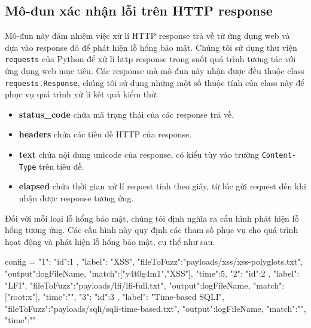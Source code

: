 \subsection{Mô-đun xác nhận lỗi trên HTTP response}
Mô-đun này đảm nhiệm việc xử lí HTTP response trả về từ ứng dụng web và dựa vào response đó để phát hiện lỗ hổng bảo mật. Chúng tôi sử dụng thư viện \texttt{requests} của Python để xử lí \acrshort{http} response trong suốt quá trình tương tác với ứng dụng web mục tiêu. Các response mà mô-đun này nhận được đều thuộc class \texttt{requests.Response}, chúng tôi sử dụng những một số thuộc tính của class này để phục vụ quá trình xử lí kêt quả kiểm thử.
\begin{itemize}
    \item \textbf{status\_code} chứa mã trạng thái của các response trả về.
    \item \textbf{headers} chứa các tiêu đề HTTP của response.
    \item \textbf{text} chứa nội dung unicode của response, có kiểu tùy vào trường \texttt{Content-Type} trên tiêu đề.
    \item \textbf{elapsed} chứa thời gian xử lí request tính theo giây, từ lúc gửi request đến khi nhận được response tương ứng.
\end{itemize}
Đối với mỗi loại lỗ hổng bảo mật, chúng tôi định nghĩa ra cấu hình phát hiện lỗ hổng tương ứng. Các cấu hình này quy định các tham số phục vụ cho quá trình họat động và phát hiện lỗ hổng bảo mật, cụ thể như sau.\\
\begin{python}
config = {
    "1": {"id":1 , "label": "XSS", "fileToFuzz":"payloads/xss/xss-polyglots.txt", "output":logFileName, "match":["y4t0g4m1","XSS"], "time":5},
    "2": {"id":2 , "label": "LFI", "fileToFuzz":"payloads/lfi/lfi-full.txt", "output":logFileName, "match":["root:x"], "time":""},
    "3": {"id":3 , "label": "Time-based SQLI", "fileToFuzz":"payloads/sqli/sqli-time-based.txt", "output":logFileName, "match":"", "time":""}
}
\end{python}
